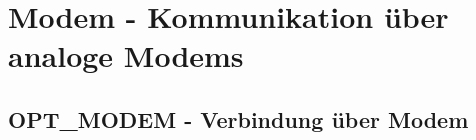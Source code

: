 \section{Modem - Kommunikation über analoge Modems}

\subsection {OPT\_MODEM - Verbindung über Modem}



